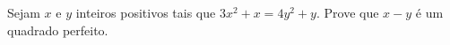 Sejam $x$ e $y$ inteiros positivos tais que $3x^2 + x = 4y^2 + y$. Prove que $x-y$ é um quadrado perfeito.

